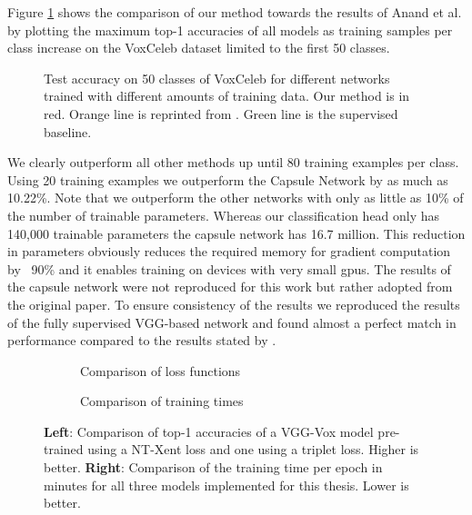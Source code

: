 Figure \ref{fig:capsule_result} shows the comparison of our method towards the results of Anand et al. \cite{anand2019shot} by plotting the maximum top-1 accuracies of all models as training samples per class increase on the VoxCeleb dataset limited to the first 50 classes.

\begin{figure}
    \centering
    
    \caption[Comparison of models on different dataset sizes]{Test accuracy on 50 classes of VoxCeleb for different networks trained with different amounts of training data. Our method is in red. Orange line is reprinted from \cite{anand2019shot}. Green line is the supervised baseline.}
    \label{fig:capsule_result}
\end{figure}

We clearly outperform all other methods up until 80 training examples per class. Using 20 training examples we outperform the Capsule Network by as much as 10.22\%. Note that we outperform the other networks with only as little as 10\% of the number of trainable parameters. Whereas our classification head only has 140,000 trainable parameters the capsule network has 16.7 million. This reduction in parameters obviously reduces the required memory for gradient computation by ~90\% and it enables training on devices with very small \glspl{gpu}. The results of the capsule network were not reproduced for this work but rather adopted from the original paper. To ensure consistency of the results we reproduced the results of the fully supervised VGG-based network and found almost a perfect match in performance compared to the results stated by \cite{anand2019shot}.

\begin{figure}[t]
  \centering
  \begin{subfigure}[b]{0.49\linewidth}
    \centering
    \scalebox{0.6}{}
    \caption{Comparison of loss functions}
    \label{fig:nt_vs_triplet}
  \end{subfigure}
  \begin{subfigure}[b]{0.49\linewidth}
    \centering
    \scalebox{0.6}{}
    \caption{Comparison of training times}
    \label{fig:times_per_epoch}
  \end{subfigure}
  \caption[Comparison of loss functions and models]{\textbf{Left}: Comparison of top-1 accuracies of a VGG-Vox model pre-trained using a NT-Xent loss and one using a triplet loss. Higher is better. \textbf{Right}: Comparison of the training time per epoch in minutes for all three models implemented for this thesis. Lower is better.}
\end{figure}


